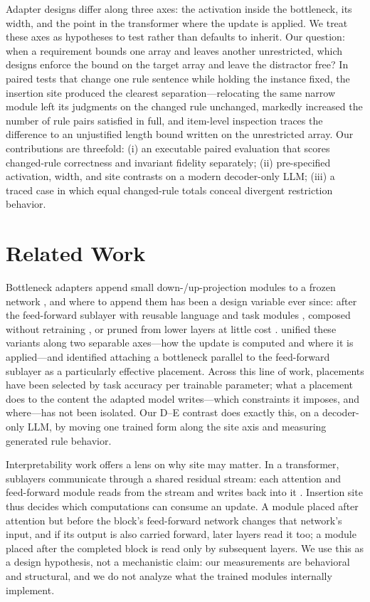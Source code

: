 Adapter designs differ along three axes: the activation inside the bottleneck, its width, and the point in the transformer where the update is applied. We treat these axes as hypotheses to test rather than defaults to inherit. Our question: when a requirement bounds one array and leaves another unrestricted, which designs enforce the bound on the target array and leave the distractor free? In paired tests that change one rule sentence while holding the instance fixed, the insertion site produced the clearest separation---relocating the same narrow module left its judgments on the changed rule unchanged, markedly increased the number of rule pairs satisfied in full, and item-level inspection traces the difference to an unjustified length bound written on the unrestricted array. Our contributions are threefold: (i) an executable paired evaluation that scores changed-rule correctness and invariant fidelity separately; (ii) pre-specified activation, width, and site contrasts on a modern decoder-only LLM; (iii) a traced case in which equal changed-rule totals conceal divergent restriction behavior.

\section{Related Work}
Bottleneck adapters append small down-/up-projection modules to a frozen network \citep{houlsby2019}, and where to append them has been a design variable ever since: after the feed-forward sublayer with reusable language and task modules \citep{pfeiffer2020}, composed without retraining \citep{pfeiffer2021}, or pruned from lower layers at little cost \citep{ruckle2021}. \citet{he2022} unified these variants along two separable axes---how the update is computed and where it is applied---and identified attaching a bottleneck parallel to the feed-forward sublayer as a particularly effective placement. Across this line of work, placements have been selected by task accuracy per trainable parameter; what a placement does to the content the adapted model writes---which constraints it imposes, and where---has not been isolated. Our D--E contrast does exactly this, on a decoder-only LLM, by moving one trained form along the site axis and measuring generated rule behavior.

Interpretability work offers a lens on why site may matter. In a transformer, sublayers communicate through a shared residual stream: each attention and feed-forward module reads from the stream and writes back into it \citep{elhage2021}. Insertion site thus decides which computations can consume an update. A module placed after attention but before the block's feed-forward network changes that network's input, and if its output is also carried forward, later layers read it too; a module placed after the completed block is read only by subsequent layers. We use this as a design hypothesis, not a mechanistic claim: our measurements are behavioral and structural, and we do not analyze what the trained modules internally implement.


